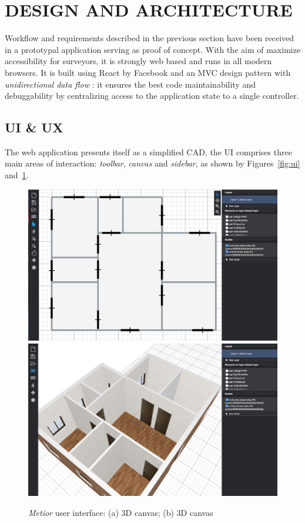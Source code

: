 \section{\uppercase{Design and Architecture}}
\label{sec:architecture}

\noindent Workflow and requirements described in the previous section have been received in a prototypal application serving as proof of concept. With the aim of maximize accessibility for surveyors, it is strongly web based and runs in all modern browsers. It is built using React by Facebook and an MVC design pattern with \emph{unidirectional data flow} \cite{redux}:  it ensures the best code maintainability and debuggability by centralizing access to the application state to a single controller.

\vspace{-3mm}\subsection{UI \& UX}\vspace{-3mm}

The web application presents itself as a simplified CAD,  the UI comprises three main areas of interaction: \emph{toolbar}, \emph{canvas} and \emph{sidebar}, as shown by Figures~\ref{fig:ui} and~\ref{fig:ui2}.

\begin{figure}[htbp] %
   \centering
   \includegraphics[width=1\linewidth]{images/2d}
   \label{fig:ui}
   \includegraphics[width=1\linewidth]{images/3d}
   \caption{\emph{Metior} user interface: (a) 3D canvas; (b) 3D canvas}
   \label{fig:ui2}
\end{figure}

